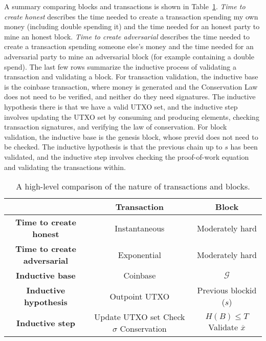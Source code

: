 A summary comparing blocks and transactions is shown in Table~\ref{tbl:tx-block-compare}.
\emph{Time to create honest} describes the time needed to create a transaction spending my
own money (including double spending it) and the time needed for an honest party to mine an honest block.
\emph{Time to create adversarial} describes the time needed to create a transaction spending
someone else's money and the time needed for an adversarial party to mine an adversarial
block (for example containing a double spend). The last few rows summarize the inductive
process of validating a transaction and validating a block. For transaction validation, the
inductive base is the coinbase transaction, where money is generated and the Conservation Law
does not need to be verified, and neither do they need signatures.
The inductive hypothesis there is that we have a valid UTXO set,
and the inductive step involves updating the UTXO set by consuming and producing elements,
checking transaction signatures, and verifying the law of conservation. For block validation,
the inductive base is the genesis block, whose previd does not need to be checked. The inductive
hypothesis is that the previous chain up to $s$ has been validated, and the inductive step
involves checking the proof-of-work equation and validating the transactions within.

\begin{table}
\centering
\begin{tabular}{ |c|c|c| }
  \hline
  & \textbf{Transaction} & \textbf{Block} \\
  \hline
  \textbf{Time to create honest} & Instantaneous & Moderately hard \\
  \hline
  \textbf{Time to create adversarial} & Exponential & Moderately hard \\
  \hline
  \textbf{Inductive base} & Coinbase & $\mathcal{G}$ \\
  \hline
  \textbf{Inductive hypothesis} & Outpoint UTXO & Previous blockid ($s$) \\
  \hline
  \textbf{Inductive step} & \makecell{Update UTXO set \\ Check $\sigma$ \\ Conservation} & \makecell{$H(B) \leq T$ \\ Validate $\overline{x}$} \\
  \hline
\end{tabular}
\caption{A high-level comparison of the nature of transactions and blocks.}
\label{tbl:tx-block-compare}
\end{table}

